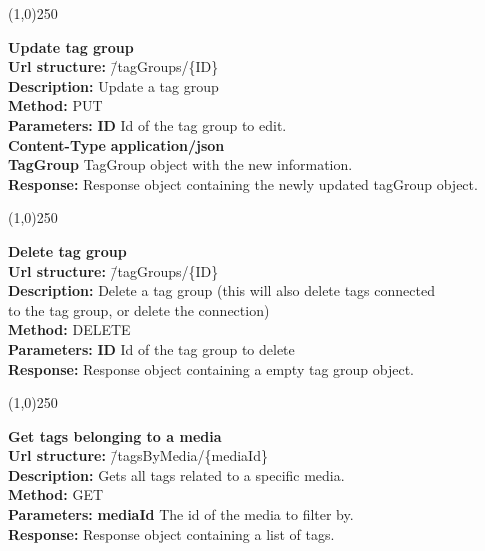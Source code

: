 \documentclass[11pt]{article}
\begin{document}
\begin{center}\line(1,0){250}\end{center}

\begin{tabbing}
\textbf{Update tag group} \\
\textcolor{black!60}{\textbf{Url structure:}} \hspace{0.2in} \= /tagGroups/\{ID\} \\
\textcolor{black!60}{\textbf{Description:}} \> Update a tag group \\
\textcolor{black!60}{\textbf{Method:}} \> PUT \\
\textcolor{black!60}{\textbf{Parameters:}} \> \textbf{ID} Id of the tag group to edit. \\
\textcolor{black!60}{\textbf{Content-Type}} \> \textbf{application/json} \\
\> \textbf{TagGroup} TagGroup object with the new information. \\
\textcolor{black!60}{\textbf{Response:}} \> Response object containing the newly updated tagGroup object.
\end{tabbing}

\begin{center}\line(1,0){250}\end{center}

\begin{tabbing}
\textbf{Delete tag group} \\
\textcolor{black!60}{\textbf{Url structure:}} \hspace{0.2in} \= /tagGroups/\{ID\} \\
\textcolor{black!60}{\textbf{Description:}}  \> Delete a tag group (this will also delete tags connected \\ \> to the tag group, or delete the connection) \\
\textcolor{black!60}{\textbf{Method:}} \> DELETE \\
\textcolor{black!60}{\textbf{Parameters:}} \> \textbf{ID} Id of the tag group to delete \\
\textcolor{black!60}{\textbf{Response:}} \> Response object containing a empty tag group object.
\end{tabbing}

\begin{center}\line(1,0){250}\end{center}

\begin{tabbing}
\textbf{Get tags belonging to a media} \\
\textcolor{black!60}{\textbf{Url structure:}} \hspace{0.2in} \= /tagsByMedia/\{mediaId\} \\
\textcolor{black!60}{\textbf{Description:}}  \> Gets all tags related to a specific media. \\
\textcolor{black!60}{\textbf{Method:}} \> GET \\
\textcolor{black!60}{\textbf{Parameters:}} \> \textbf{mediaId} The id of the media to filter by. \\
\textcolor{black!60}{\textbf{Response:}} \> Response object containing a list of tags.
\end{tabbing}
\end{document}
